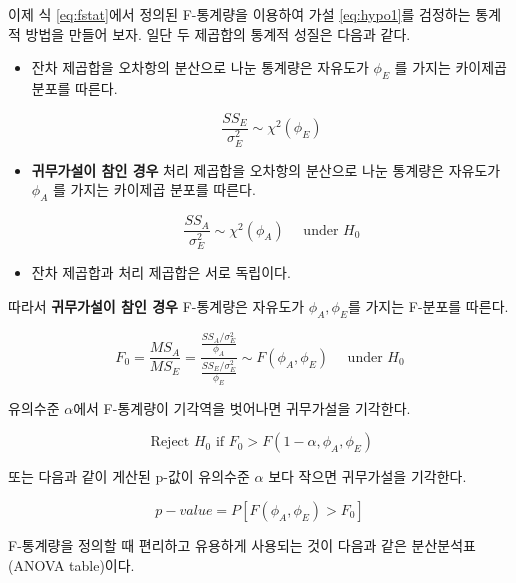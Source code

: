 \documentclass[
]{book}
\begin{document}
이제 식 \eqref{eq:fstat}에서 정의된 F-통계량을 이용하여 가설 \eqref{eq:hypo1}를 검정하는 통계적 방법을 만들어 보자. 일단 두 제곱합의 통계적 성질은 다음과 같다.

\begin{itemize}
\item
  잔차 제곱합을 오차항의 분산으로 나눈 통계량은 자유도가 \(\phi_E\) 를 가지는 카이제곱 분포를 따른다.

  \[ \frac{SS_E}{\sigma_E^2}  \sim \chi^2(\phi_E) \]
\item
  \textbf{귀무가설이 참인 경우} 처리 제곱합을 오차항의 분산으로 나눈 통계량은 자유도가 \(\phi_A\) 를 가지는 카이제곱 분포를 따른다.

  \[ \frac{SS_A}{\sigma_E^2}  \sim \chi^2(\phi_A) \quad \text{ under } H_0  \]
\item
  잔차 제곱합과 처리 제곱합은 서로 독립이다.
\end{itemize}

따라서 \textbf{귀무가설이 참인 경우} F-통계량은 자유도가 \(\phi_A, \phi_E\)를 가지는 F-분포를 따른다.

\begin{equation}
F_0 =  \frac{MS_A}{MS_E} = \frac{ \tfrac{SS_A/\sigma_E^2}{\phi_A}} {\tfrac{SS_E/\sigma_E^2}{\phi_E }}  \sim F(\phi_A, \phi_E) \quad \text{ under } H_0  
\label{eq:ftest}
\end{equation}

유의수준 \(\alpha\)에서 F-통계량이 기각역을 벗어나면 귀무가설을 기각한다.

\[ \text{ Reject } H_0 \text{ if } F_0 > F(1-\alpha, \phi_A, \phi_E)  \]

또는 다음과 같이 게산된 p-값이 유의수준 \(\alpha\) 보다 작으면 귀무가설을 기각한다.

\[ p-value = P[F(\phi_A, \phi_E) > F_0  ]   \]

F-통계량을 정의할 때 편리하고 유용하게 사용되는 것이 다음과 같은 분산분석표(ANOVA table)이다.
\end{document}
